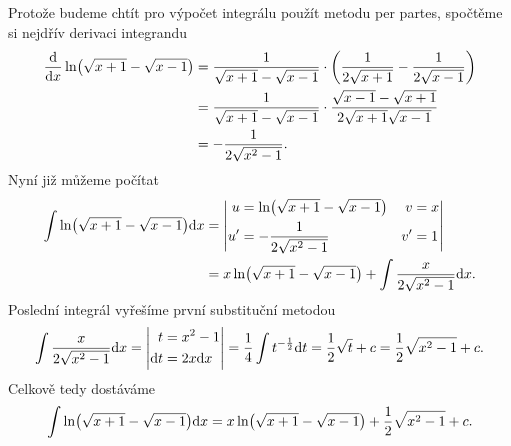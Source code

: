 \documentclass[answers]{exam}
\begin{document}
\begin{questions}
\begin{solution}
    Protože budeme chtít pro výpočet integrálu použít metodu per partes, spočtěme si nejdřív derivaci integrandu
    \begin{align*}
      \dd{}{x} \ln \parens{\sqrt{x + 1} - \sqrt{x - 1}}
      &=
      \frac{1}{\sqrt{x + 1} - \sqrt{x - 1}}
      \cdot
      \left( \frac{1}{2 \sqrt{x + 1}} - \frac{1}{2 \sqrt{x - 1}} \right)
      \\
      &=
      \frac{1}{\sqrt{x + 1} - \sqrt{x - 1}}
      \cdot
      \frac{\sqrt{x - 1} - \sqrt{x + 1}}{2 \sqrt{x + 1} \sqrt{x - 1}}
      \\
      &=
      -\frac{1}{2\sqrt{x^2 - 1}}.
    \end{align*}
    Nyní již můžeme počítat
    \begin{align*}
      \int \ln \parens{\sqrt{x + 1} - \sqrt{x - 1}} \diff x
      &=
      \left| 
        \begin{aligned}
          u &= \ln \parens{\sqrt{x + 1} - \sqrt{x - 1}} & v &= x
          \\
          u' &= -\frac{1}{2\sqrt{x^2 - 1}} & v' &= 1
        \end{aligned}
      \right|
      \\
      &=
      x \ln \parens{\sqrt{x + 1} - \sqrt{x - 1}}
      +
      \int \frac{x}{2\sqrt{x^2 - 1}} \diff x.
    \end{align*}
    Poslední integrál vyřešíme první substituční metodou
    \begin{equation*}
      \int \frac{x}{2\sqrt{x^2 - 1}} \diff x
      =
      \left| 
        \begin{aligned}
          t &= x^2 - 1
          \\
          \diff t & = 2x \diff x
        \end{aligned}
      \right|
      =
      \frac{1}{4} \int t^{-\frac{1}{2}} \diff t
      =
      \frac{1}{2} \sqrt{t} + c
      =
      \frac{1}{2} \sqrt{x^2 - 1} + c.
    \end{equation*}
    Celkově tedy dostáváme
    \begin{equation*}
      \int \ln \parens{\sqrt{x + 1} - \sqrt{x - 1}} \diff x
      =
      x \ln \parens{\sqrt{x + 1} - \sqrt{x - 1}}
      +
      \frac{1}{2} \sqrt{x^2 - 1} 
      + c.
    \end{equation*}
  \end{solution}
  

\end{questions}
\end{document}
